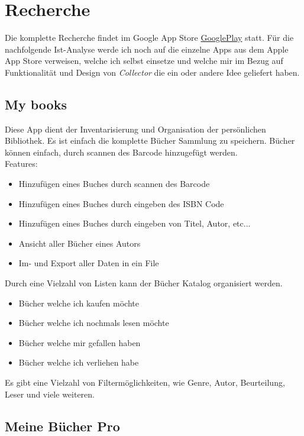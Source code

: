 \chapter{Recherche}

Die komplette Recherche findet im Google App Store \href{https://play.google.com/store/apps}{GooglePlay} statt. Für die nachfolgende Ist-Analyse werde ich noch auf die einzelne Apps aus dem Apple App Store verweisen, welche ich selbst einsetze und welche mir im Bezug auf Funktionalität und Design von \emph{Collector} die ein oder andere Idee geliefert haben.

\section{My books}

Diese App dient der Inventarisierung und Organisation der persönlichen Bibliothek. Es ist einfach die komplette Bücher Sammlung zu speichern. Bücher können einfach, durch scannen des Barcode hinzugefügt werden.\\

Features:
\begin{itemize}
	\item Hinzufügen eines Buches durch scannen des Barcode
	\item Hinzufügen eines Buches durch eingeben des ISBN Code
	\item Hinzufügen eines Buches durch eingeben von Titel, Autor, etc...
	\item Ansicht aller Bücher eines Autors
	\item Im- und Export aller Daten in ein File
\end{itemize}

Durch eine Vielzahl von Listen kann der Bücher Katalog organisiert werden.
\begin{itemize}
	\item Bücher welche ich kaufen möchte
	\item Bücher welche ich nochmals lesen möchte
	\item Bücher welche mir gefallen haben
	\item Bücher welche ich verliehen habe
\end{itemize} 

Es gibt eine Vielzahl von Filtermöglichkeiten, wie Genre, Autor, Beurteilung, Leser und viele weiteren.\cite{MyBooks}

\section{Meine Bücher Pro}

